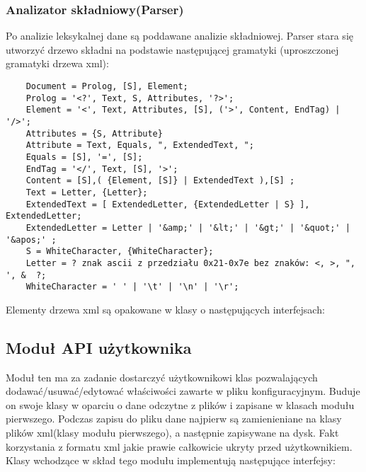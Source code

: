 \documentclass{article}
\begin{document}
\subsubsection{Analizator składniowy(Parser)}
Po analizie leksykalnej dane są poddawane analizie składniowej.
Parser stara się utworzyć drzewo składni na podstawie następującej gramatyki
(uproszczonej gramatyki drzewa xml):

\begin{verbatim} 
	Document = Prolog, [S], Element;
	Prolog = '<?', Text, S, Attributes, '?>';
	Element	= '<', Text, Attributes, [S], ('>', Content, EndTag) | '/>';
	Attributes = {S, Attribute}
	Attribute = Text, Equals, ", ExtendedText, ";
	Equals = [S], '=', [S];
	EndTag = '</', Text, [S], '>';
	Content = [S],( {Element, [S]} | ExtendedText ),[S] ; 
	Text = Letter, {Letter};
	ExtendedText = [ ExtendedLetter, {ExtendedLetter | S} ], ExtendedLetter;
	ExtendedLetter = Letter | '&amp;' | '&lt;' | '&gt;' | '&quot;' | '&apos;' ;
	S = WhiteCharacter, {WhiteCharacter};
	Letter = ? znak ascii z przedziału 0x21-0x7e bez znaków: <, >, ", ', &  ?;
	WhiteCharacter = ' ' | '\t' | '\n' | '\r';
\end{verbatim}

Elementy drzewa xml są opakowane w klasy o następujących interfejsach:



\subsection{Moduł API użytkownika}
Moduł ten ma za zadanie dostarczyć użytkownikowi klas pozwalających dodawać/usuwać/edytować
właściwości zawarte w pliku konfiguracyjnym.
Buduje on swoje klasy w oparciu o dane odczytne z plików i zapisane w klasach modułu pierwszego.
Podczas zapisu do pliku dane najpierw są zamienieniane na klasy plików xml(klasy modułu pierwszego),
a następnie zapisywane na dysk. Fakt korzystania z formatu xml jakie prawie całkowicie ukryty przed użytkownikiem.
Klasy wchodzące w skład tego modułu implementują następujące interfejsy:

\newpage


\end{document}
